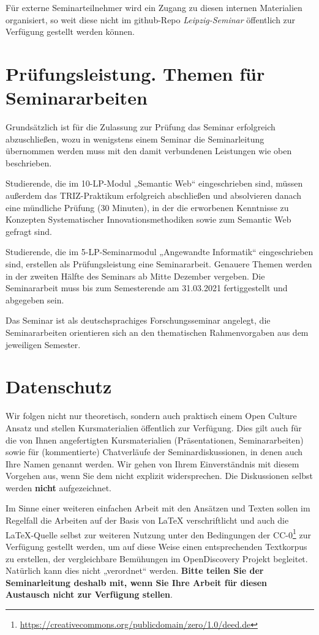 \documentclass[11pt,a4paper]{article}
\begin{document}
Für externe Seminarteilnehmer wird ein Zugang zu diesen internen Materialien
organisiert, so weit diese nicht im github-Repo \emph{Leipzig-Seminar}
öffentlich zur Verfügung gestellt werden können.

\section{Prüfungsleistung. Themen für Seminararbeiten}

Grundsätzlich ist für die Zulassung zur Prüfung das Seminar erfolgreich
abzuschließen, wozu in wenigstens einem Seminar die Seminarleitung übernommen
werden muss mit den damit verbundenen Leistungen wie oben beschrieben.

Studierende, die im 10-LP-Modul „Semantic Web“ eingeschrieben sind, müssen
außerdem das TRIZ-Praktikum erfolgreich abschließen und absolvieren danach
eine mündliche Prüfung (30 Minuten), in der die erworbenen Kenntnisse zu
Konzepten Systematischer Innovationsmethodiken sowie zum Semantic Web gefragt
sind.

Studierende, die im 5-LP-Seminarmodul „Angewandte Informatik“ eingeschrieben
sind, erstellen als Prüfungsleistung eine Seminararbeit. Genauere Themen
werden in der zweiten Hälfte des Seminars ab Mitte Dezember vergeben. Die
Seminararbeit muss bis zum Semesterende am 31.03.2021 fertiggestellt und
abgegeben sein. 

Das Seminar ist als deutschsprachiges Forschungsseminar angelegt, die
Seminararbeiten orientieren sich an den thematischen Rahmenvorgaben aus dem
jeweiligen Semester.

\section{Datenschutz}

Wir folgen nicht nur theoretisch, sondern auch praktisch einem Open Culture
Ansatz und stellen Kursmaterialien öffentlich zur Verfügung.  Dies gilt auch
für die von Ihnen angefertigten Kursmaterialien (Präsentationen,
Seminararbeiten) sowie für (kommentierte) Chatverläufe der
Seminardiskussionen, in denen auch Ihre Namen genannt werden.  Wir gehen von
Ihrem Einverständnis mit diesem Vorgehen aus, wenn Sie dem nicht explizit
widersprechen.  Die Diskussionen selbst werden \textbf{nicht} aufgezeichnet.

Im Sinne einer weiteren einfachen Arbeit mit den Ansätzen und Texten sollen im
Regelfall die Arbeiten auf der Basis von {\LaTeX} verschriftlicht und auch die
\LaTeX-Quelle selbst zur weiteren Nutzung unter den Bedingungen der
CC-0\footnote{\url{https://creativecommons.org/publicdomain/zero/1.0/deed.de}}
zur Verfügung gestellt werden, um auf diese Weise einen entsprechenden
Textkorpus zu erstellen, der vergleichbare Bemühungen im OpenDiscovery Projekt
begleitet.  Natürlich kann dies nicht „verordnet“ werden. \textbf{Bitte teilen
  Sie der Seminarleitung deshalb mit, wenn Sie Ihre Arbeit für diesen
  Austausch nicht zur Verfügung stellen}.
\end{document}
